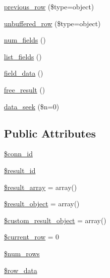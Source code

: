 \begin{DoxyCompactItemize}
\item 
\mbox{\hyperlink{class_c_i___d_b__result_a458567a19d160a814b41b2964ec192ce}{previous\+\_\+row}} (\$type=\textquotesingle{}object\textquotesingle{})
\item 
\mbox{\hyperlink{class_c_i___d_b__result_a75f3fff759e63b51c93bb1588e9b0a77}{unbuffered\+\_\+row}} (\$type=\textquotesingle{}object\textquotesingle{})
\item 
\mbox{\hyperlink{class_c_i___d_b__result_af831bf363e4d7d661a717a4932af449d}{num\+\_\+fields}} ()
\item 
\mbox{\hyperlink{class_c_i___d_b__result_a50b54eb4ea7cfd039740f532988ea776}{list\+\_\+fields}} ()
\item 
\mbox{\hyperlink{class_c_i___d_b__result_a84bffd65e53902ade1591716749a33e3}{field\+\_\+data}} ()
\item 
\mbox{\hyperlink{class_c_i___d_b__result_aad2d98d6beb3d6095405356c6107b473}{free\+\_\+result}} ()
\item 
\mbox{\hyperlink{class_c_i___d_b__result_a8255ae91816e4206e29eb7581c5af0f1}{data\+\_\+seek}} (\$n=0)
\end{DoxyCompactItemize}
\subsection*{Public Attributes}
\begin{DoxyCompactItemize}
\item 
\mbox{\hyperlink{class_c_i___d_b__result_a16c23f1dcbfed2f2759f5e54f604106d}{\$conn\+\_\+id}}
\item 
\mbox{\hyperlink{class_c_i___d_b__result_a0ebacb40e3b6f8bf33d3de0f2cc71474}{\$result\+\_\+id}}
\item 
\mbox{\hyperlink{class_c_i___d_b__result_a153392b3ec395131d32c70cda855698e}{\$result\+\_\+array}} = array()
\item 
\mbox{\hyperlink{class_c_i___d_b__result_aa292cbb3dbb8c654cb4f6c61f250efd3}{\$result\+\_\+object}} = array()
\item 
\mbox{\hyperlink{class_c_i___d_b__result_a680c2e11eeb189d9bb8ba2a552766b7b}{\$custom\+\_\+result\+\_\+object}} = array()
\item 
\mbox{\hyperlink{class_c_i___d_b__result_a2ec3a266ee95cda75cdbb71bc9ee1b53}{\$current\+\_\+row}} = 0
\item 
\mbox{\hyperlink{class_c_i___d_b__result_ac926549b713e71c5f5fd63999cebfb8c}{\$num\+\_\+rows}}
\item 
\mbox{\hyperlink{class_c_i___d_b__result_a335b4c27a1529df9e484e044e470ec07}{\$row\+\_\+data}}
\end{DoxyCompactItemize}
